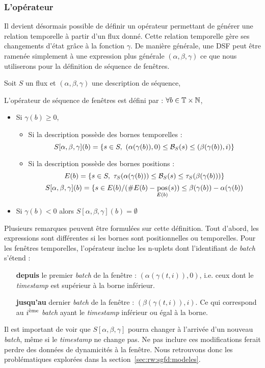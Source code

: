 \subsubsection{L'opérateur}
Il devient désormais possible de définir un opérateur permettant  de générer une relation temporelle à partir d'un flux donné. Cette relation temporelle gère ses changements d'état grâce à la fonction $\gamma$. De manière générale, une DSF peut être ramenée simplement à une expression plus générale $(\alpha,\beta,\gamma)$ ce que nous utiliserons pour la définition de séquence de fenêtres.
\begin{defi}
	Soit $S$ un flux et $(\alpha, \beta, \gamma)$ une description de séquence,
	
	L'opérateur de séquence de fenêtres est défini par : $\forall b \in \mathbb{T}\times\mathbb{N}$, 
	\begin{itemize}
		\item Si $\gamma(b) \geq 0$, 
		\begin{itemize}
			\item Si la description possède des bornes temporelles :
			$$S[\alpha,\beta,\gamma](b) = \left\{s\in S, \ (\alpha(\gamma(b)),0)\leq \BS(s) \leq (\beta(\gamma(b)),i)\right\}$$
			\item Si la description possède des bornes positions :
			$$E(b) = \left\{s\in S, \ \tau_S(\alpha(\gamma(b)))\leq \BS(s) \leq \tau_S(\beta(\gamma(b)))\right\}$$
			$$S[\alpha,\beta,\gamma](b) = \{s \in E(b) / (\#E(b) - \mathop{\mathrm{pos}}_{E(b)}(s)) \leq \beta(\gamma(b)) - \alpha(\gamma(b))$$
		\end{itemize}
		\item Si $\gamma(b) <0$ alors $S[\alpha,\beta,\gamma](b) = \emptyset$
	\end{itemize}
\end{defi}

Plusieurs remarques peuvent être formulées sur cette définition. Tout d'abord, les expressions sont différentes si les bornes sont positionnelles ou temporelles. Pour les fenêtres temporelles, l'opérateur inclue les n-uplets dont l'identifiant de \textit{batch} s'étend :
\begin{itemize}
	\item[\textbf{depuis}] le premier \textit{batch} de la fenêtre : $(\alpha(\gamma(t,i)),0)$, i.e. ceux dont le \textit{timestamp} est supérieur à la borne inférieur.
	\item[\textbf{jusqu'au}] dernier \textit{batch} de la fenêtre : $(\beta(\gamma(t,i)),i)$. Ce qui correspond au $i^{\textrm{\`{e}me}}$ \textit{batch} ayant le \textit{timestamp} inférieur ou égal à la borne.
\end{itemize}
Il est important de voir que $S[\alpha,\beta,\gamma]$ pourra changer à l'arrivée d'un nouveau \textit{batch}, même si le \textit{timestamp} ne change pas. Ne pas inclure ces modifications ferait perdre des données de dynamicités à la fenêtre. Nous retrouvons donc les problématiques explorées dans la section~\ref{sec:rw:sgfd:modeles}.

